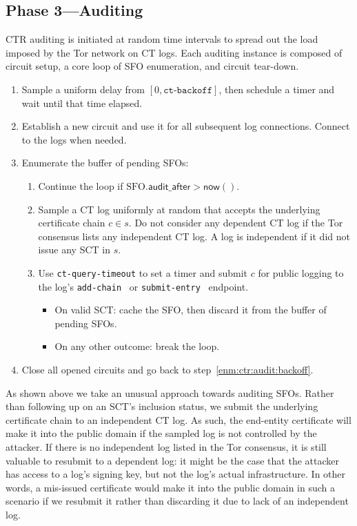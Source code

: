 \subsection{Phase 3---Auditing} \label{sec:design-ca:phase3}
CTR auditing is initiated at random time intervals to spread out the load
imposed by the Tor network on CT logs.  Each auditing instance is composed of
circuit setup, a core loop of SFO enumeration, and circuit tear-down.

\begin{enumerate}
	\item\label{enm:ctr:audit:backoff} Sample a uniform delay from
			$[0, \texttt{ct-backoff}]$,
		then schedule a timer and wait until that time elapsed.
	\item\label{enm:ctr:audit:log-circuit} Establish a new circuit and use it
		for all subsequent log connections.  Connect to the logs when needed.
	\item\label{enm:ctr:audit:loop} Enumerate the buffer of pending SFOs:
		\begin{enumerate}
			\item\label{enm:ctr:audit:too-soon} Continue the loop if
				$\textrm{SFO}.\mathsf{audit\_after} > \mathsf{now}()$.
			\item\label{enm:ctr:audit:sample}
				Sample a CT log uniformly at random that accepts the underlying
				certificate chain $c \in s$.  Do not consider any dependent CT
				log if the Tor consensus lists any independent CT log.  A log
				is independent if it did not issue any SCT in $s$.
			\item\label{enm:ctr:audit:log} Use \texttt{ct-query-timeout} to set
				a timer and submit $c$ for public logging to the log's
				\texttt{add-chain}~\cite{ct} or
				\texttt{submit-entry}~\cite{ct/bis} endpoint.
				\begin{itemize}
					\item\label{enm:ctr:audit:log:success} On valid
						SCT: cache the SFO, then discard it from the buffer of
						pending SFOs.
					\item\label{enm:ctr:audit:log:fail} On any other outcome:
						break the loop.
				\end{itemize}
		\end{enumerate}
	\item\label{enm:ctr:audit:teardown} Close all opened circuits and go back to
		step~\ref{enm:ctr:audit:backoff}.
\end{enumerate}

As shown above we take an unusual approach towards auditing SFOs.  Rather than
following up on an SCT's inclusion status, we submit the underlying certificate
chain to an independent CT log.  As such, the end-entity certificate will make
it into the public domain if the sampled log is not controlled by the attacker.
If there is no independent log listed in the Tor consensus, it is still valuable
to resubmit to a dependent log:
	it might be the case that the attacker has access to a log's signing key,
	but not the log's actual infrastructure.
In other words, a mis-issued certificate would make it into the public domain in
such a scenario if we resubmit it rather than discarding it due to lack of
an independent log.

